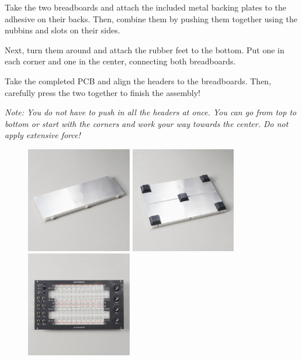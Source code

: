 \documentclass[12pt, a4paper]{article}
\begin{document}
Take the two breadboards and attach the included metal backing plates to the adhesive on their
backs. Then, combine them by pushing them together using the nubbins and slots on their sides.

Next, turn them around and attach the rubber feet to the bottom. Put one in each corner and one
in the center, connecting both breadboards.

Take the completed PCB and align the headers to the breadboards. Then, carefully press the two
together to finish the assembly!

\textit{%
    Note: You do not have to push in all the headers at once. You can go from top to bottom or
    start with the corners and work your way towards the center. Do not apply extensive force!
}

\begin{figure}[H]
    \centering
    \includegraphics[width=46mm]{images/40_03_metal_plate.jpg}
    \hspace{2mm}
    \includegraphics[width=46mm]{images/40_04_rubberfeet.jpg}
    \hspace{2mm}
    \includegraphics[width=46mm]{images/40_05_fully_assembled.jpg}
\end{figure}
\end{document}
